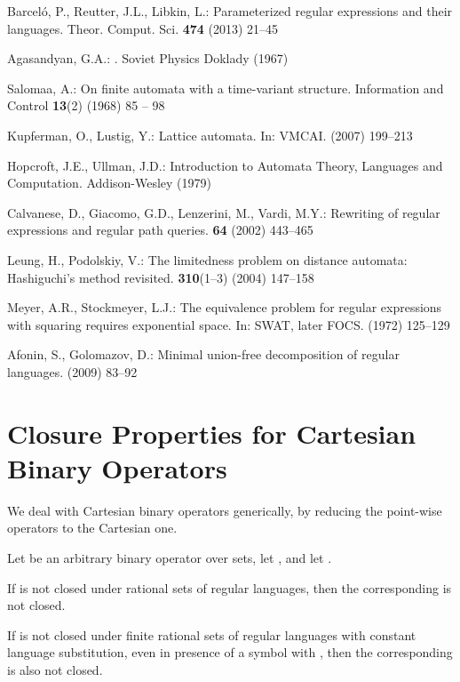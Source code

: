 \documentclass[envcountsame]{llncs}
\newcommand{\RegularlyGeneratedLanguageSets}{rational sets of regular languages\xspace}
\begin{document}
\begin{thebibliography}{10}
Barcel{\'o}, P., Reutter, J.L., Libkin, L.:
\newblock Parameterized regular expressions and their languages.
\newblock Theor. Comput. Sci. \textbf{474} (2013)  21--45

{Agasandyan}, G.A.:
.
\newblock Soviet Physics Doklady (1967)

Salomaa, A.:
\newblock On finite automata with a time-variant structure.
\newblock Information and Control \textbf{13}(2) (1968)  85 -- 98

Kupferman, O., Lustig, Y.:
\newblock Lattice automata.
\newblock In: {VMCAI}.
\newblock (2007)  199--213

Hopcroft, J.E., Ullman, J.D.:
\newblock Introduction to Automata Theory, Languages and Computation.
\newblock Addison-Wesley (1979)

Calvanese, D., Giacomo, G.D., Lenzerini, M., Vardi, M.Y.:
\newblock Rewriting of regular expressions and regular path queries.
 \textbf{64} (2002)  443--465

Leung, H., Podolskiy, V.:
\newblock The limitedness problem on distance automata: Hashiguchi's method
  revisited.
 \textbf{310}(1--3) (2004)  147--158

Meyer, A.R., Stockmeyer, L.J.:
\newblock The equivalence problem for regular expressions with squaring
  requires exponential space.
\newblock In: {SWAT, later FOCS}. (1972)  125--129

Afonin, S., Golomazov, D.:
\newblock Minimal union-free decomposition of regular languages.
\newblock (2009)  83--92

\end{thebibliography}


\appendix
\section{Closure Properties for Cartesian Binary Operators}
\label{sec:proofs:cart-binary-oper}

We deal with Cartesian binary operators generically, by reducing the
point-wise operators to the Cartesian one. 

\begin{lemma}
  \label{lem:reducing-point-wise-to-cartesian}
  Let  be an arbitrary binary operator over sets, let , and let .
  \begin{inparaenum}
  \item If  is not closed under \RegularlyGeneratedLanguageSets,
    then the corresponding  is not closed.
  \item If  is not closed under finite 
  	\RegularlyGeneratedLanguageSets with constant language 
  	substitution, even in presence of a
    symbol  with , then the corresponding
     is also not closed.
  \end{inparaenum}
\end{lemma}
\end{document}

